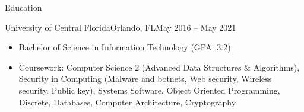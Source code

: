 \documentclass[calibri]{mcdowellcv}
\begin{document}
	\begin{cvsection}{Education}
		\begin{cvsubsection}{University of Central Florida}{Orlando, FL}{May 2016 -- May 2021}
			\begin{itemize}
				\item Bachelor of Science in Information Technology (GPA: 3.2)
				\item Coursework: Computer Science 2 (Advanced Data Structures \& Algorithms), Security in Computing (Malware and botnets, Web security, Wireless security, Public key), Systems Software, Object Oriented Programming, Discrete, Databases, Computer Architecture, Cryptography
			\end{itemize}
		\end{cvsubsection}
	\end{cvsection}
	
\end{document}
